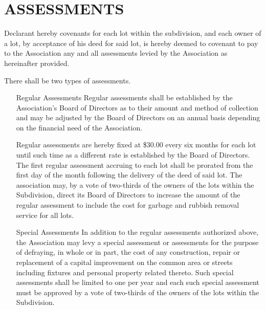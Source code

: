 \documentclass[12pt, letterpaper]{article}
\begin{document}
\section{ASSESSMENTS}
Declarant hereby covenants for each lot within the subdivision, and each owner of a lot, by acceptance of his deed for said lot, is hereby deemed to covenant to pay to the Association any and all assessments levied by the Association as hereinafter provided.

There shall be two types of assessments.

\begin{enumerate}
\item[Regular Assessments] Regular assessments shall be established by the Association's Board of Directors as to their amount and method of collection and may be adjusted by the Board of Directors on an annual basis depending on the financial need of the Association.

Regular assessments are hereby fixed at \$30.00 every six months for each lot until such time as a different rate is established by the Board of Directors.
The first regular assessment accruing to each lot shall be prorated from the first day of the month following the delivery of the deed of said lot.
The association may, by a vote of two-thirds of the owners of the lots within the Subdivision, direct its Board of Directors to increase the amount of the regular assessment to include the cost for garbage and rubbish removal service for all lots.
\item[Special Assessments] In addition to the regular assessments authorized above, the Association may levy a special assessment or assessments for the purpose of defraying, in whole or in part, the cost of any construction, repair or replacement of a capital improvement on the common area or streets including fixtures and personal property related thereto.
Such special assessments shall be limited to one per year and each such special assessment must be approved by a vote of two-thirds of the owners of the lots within the Subdivision.


\end{enumerate}
\end{document}
